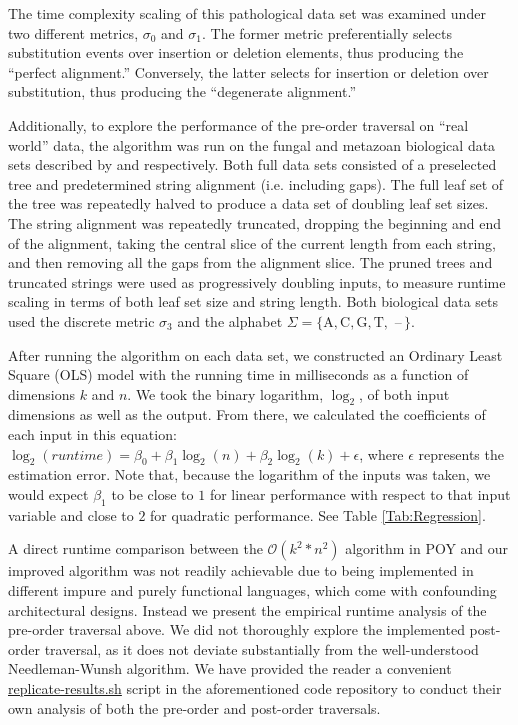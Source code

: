 \documentclass{bmcart}
\begin{document}
The time complexity scaling of this pathological data set was examined under two different metrics, $\sigma_0$ and $\sigma_1$.
The former metric preferentially selects substitution events over insertion or deletion elements, thus producing the ``perfect alignment.''
Conversely, the latter selects for insertion or deletion over substitution, thus producing the ``degenerate alignment.''

Additionally, to explore the performance of the pre-order traversal on ``real world'' data, the algorithm was run on the fungal and metazoan biological data sets described by \cite{GiribetandWheeler1999} and \cite{GiribetandWheeler2001} respectively.
Both full data sets consisted of a preselected tree and predetermined string alignment (i.e. including gaps).
The full leaf set of the tree was repeatedly halved to produce a data set of doubling leaf set sizes.
The string alignment was repeatedly truncated, dropping the beginning and end of the alignment, taking the central slice of the current length from each string, and then removing all the gaps from the alignment slice.
The pruned trees and truncated strings were used as progressively doubling inputs, to measure runtime scaling in terms of both leaf set size and string length.
Both biological data sets used the discrete metric $\sigma_3$ and the alphabet $\Sigma = \{\mathrm{A, C, G, T,}$ --$\,\}$.


After running the algorithm on each data set, we constructed an Ordinary Least Square (OLS) model with the running time in milliseconds as a function of dimensions $k$ and $n$.
We took the binary logarithm, $\log_{2}$, of both input dimensions as well as the output.
From there, we calculated the coefficients of each input in this equation: $\log_2(runtime) = \beta_0 + \beta_1 \log_2(n) + \beta_2 \log_2(k) + \epsilon$, where $\epsilon$ represents the estimation error.
Note that, because the logarithm of the inputs was taken, we would expect $\beta_1$ to be close to $1$ for linear performance with respect to that input variable and close to $2$ for quadratic performance.
See Table \ref{Tab:Regression}.

A direct runtime comparison between the $\mathcal{O}(k^2 * n^2)$ algorithm in POY and our improved algorithm was not readily achievable due to being implemented in different impure and purely functional languages, which come with confounding architectural designs.
Instead we present the empirical runtime analysis of the pre-order traversal above.
We did not thoroughly explore the implemented post-order traversal, as it does not deviate substantially from the well-understood Needleman-Wunsh algorithm.
We have provided the reader a convenient \url{replicate-results.sh} script in the aforementioned code repository to conduct their own analysis of both the pre-order and post-order traversals.
\end{document}
